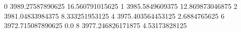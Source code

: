 0 3989.27587890625 16.560791015625
1 3985.5849609375 12.869873046875
2 3981.04833984375 8.333251953125
4 3975.403564453125 2.6884765625
6 3972.715087890625 0.0
8 3977.246826171875 4.53173828125
